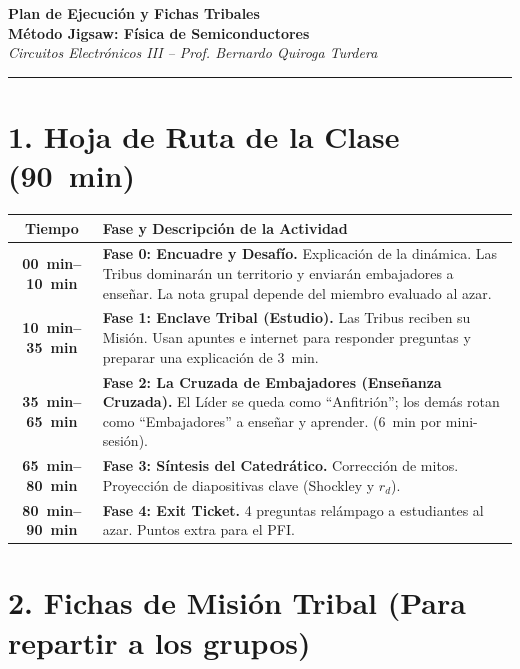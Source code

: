 \documentclass[11pt, a4paper]{article}
\begin{document}
\begin{center}
    {\LARGE \textbf{Plan de Ejecución y Fichas Tribales}}\\[0.3cm]
    {\large \textbf{Método Jigsaw: Física de Semiconductores}}\\
    \textit{Circuitos Electrónicos III -- Prof. Bernardo Quiroga Turdera}
    \vspace{0.5cm}
    \hrule
\end{center}

\section*{1. Hoja de Ruta de la Clase (\qty{90}{\minute})}
\begin{center}
\renewcommand{\arraystretch}{1.5}
\begin{tabularx}{\textwidth}{@{} >{\bfseries}c X @{}}
\toprule
Tiempo & Fase y Descripción de la Actividad \\
\midrule
\qtyrange{00}{10}{\minute} & \textbf{Fase 0: Encuadre y Desafío.} Explicación de la dinámica. Las Tribus dominarán un territorio y enviarán embajadores a enseñar. La nota grupal depende del miembro evaluado al azar. \\
\qtyrange{10}{35}{\minute} & \textbf{Fase 1: Enclave Tribal (Estudio).} Las Tribus reciben su Misión. Usan apuntes e internet para responder preguntas y preparar una explicación de \qty{3}{\minute}. \\
\qtyrange{35}{65}{\minute} & \textbf{Fase 2: La Cruzada de Embajadores (Enseñanza Cruzada).} El Líder se queda como ``Anfitrión''; los demás rotan como ``Embajadores'' a enseñar y aprender. (\qty{6}{\minute} por mini-sesión). \\
\qtyrange{65}{80}{\minute} & \textbf{Fase 3: Síntesis del Catedrático.} Corrección de mitos. Proyección de diapositivas clave (Shockley y $r_d$). \\
\qtyrange{80}{90}{\minute} & \textbf{Fase 4: Exit Ticket.} 4 preguntas relámpago a estudiantes al azar. Puntos extra para el PFI. \\
\bottomrule
\end{tabularx}
\end{center}

\vspace{0.5cm}

\section*{2. Fichas de Misión Tribal (Para repartir a los grupos)}
\end{document}

